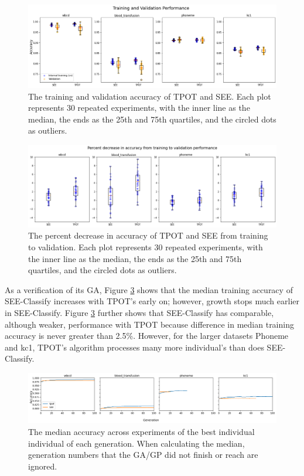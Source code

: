 \documentclass[acmsmall,screen]{acmart}
\begin{document}
\begin{figure}[h]
  \centering
  \includegraphics[width=13cm]{figures_2/see_tpot_train_valid.png}
  \caption{The training and validation accuracy of TPOT and SEE. Each plot represents 30 repeated experiments, with the inner line as the median, the ends as the 25th and 75th quartiles, and the circled dots as outliers.}
  \label{fig:train_valid}
\end{figure}


\begin{figure}[h]
  \centering
  \includegraphics[width=13cm]{figures_2/percent_drop_see_tpot_4.png}
  \caption{The percent decrease in accuracy of TPOT and SEE from training to validation. Each plot represents 30 repeated experiments, with the inner line as the median, the ends as the 25th and 75th quartiles, and the circled dots as outliers.}
  \label{fig:percent_decrease}
\end{figure}
As a verification of its GA, Figure \ref{fig:median} shows that the median training accuracy of SEE-Classify increases with TPOT's early on; however, growth stops much earlier in SEE-Classify. Figure \ref{fig:median} further shows that SEE-Classify has comparable, although weaker, performance with TPOT because difference in median training accuracy is never greater than 2.5\%. However, for the larger datasets Phoneme and kc1, TPOT's algorithm processes many more individual's than does SEE-Classify.

\begin{figure}[h]
  \centering
  \includegraphics[width=14cm]{figures_2/see_tpot_median.png}
  \caption{The median accuracy across experiments of the best individual individual of each generation. When calculating the median, generation numbers that the GA/GP did not finish or reach are ignored.}
  \label{fig:median}
\end{figure}
\end{document}

